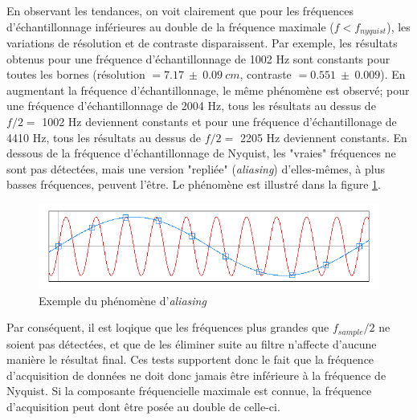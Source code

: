 \documentclass[11pt,letterpaper]{article}
\begin{document}
En observant les tendances, on voit clairement que pour les fréquences d'échantillonnage inférieures au double
de la fréquence maximale ($f<f_{nyquist}$), les variations de résolution et de contraste disparaissent. Par exemple,
les résultats obtenus pour une fréquence d'échantillonnage de 1002 Hz sont constants pour toutes les bornes (résolution $=7.17\ \pm \ 0.09\ cm$,
contraste $=0.551\ \pm\ 0.009$). En augmentant la fréquence d'échantillonnage, le même phénomène est observé; pour une fréquence d'échantillonnage de 
2004 Hz, tous les résultats au dessus de $f/2=$ 1002 Hz deviennent constants et pour une fréquence d'échantillonage de 4410 Hz, tous les résultats au dessus de
$f/2=$ 2205 Hz deviennent constants. En dessous de la fréquence d'échantillonnage de Nyquist, les "vraies" fréquences ne sont pas détectées, mais une version "repliée"
(\textit{aliasing}) d'elles-mêmes, à plus basses fréquences, peuvent l'être. Le phénomène est illustré dans la figure \ref{aliasing}. 
\begin{figure}[H]
    \centering
    \includegraphics[scale=0.5]{Aliasing-plot.png}
    \caption{Exemple du phénomène d'\textit{aliasing} \cite{nyquist}}
    \label{aliasing}
\end{figure}

Par conséquent, il est loqique que les fréquences plus grandes que $f_{sample}/2$ ne soient pas détectées, et que 
de les éliminer suite au filtre n'affecte d'aucune manière le résultat final. Ces tests supportent donc le fait que la fréquence 
d'acquisition de données ne doit donc jamais être inférieure à la fréquence de Nyquist. Si la composante fréquencielle maximale est 
connue, la fréquence d'acquisition peut dont être posée au double de celle-ci. 
\end{document}
